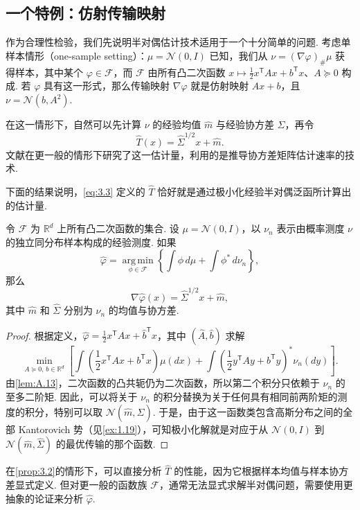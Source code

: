 \subsection{一个特例：仿射传输映射}\label{sec:3.3}
作为合理性检验，我们先说明半对偶估计技术适用于一个十分简单的问题. 考虑单样本情形（one-sample setting）：$\mu=\mathcal N(0,I)$ 已知，我们从 $\nu=(\nabla\varphi)_\#\mu$ 获得样本，其中某个 $\varphi\in\mathcal F$，而 $\mathcal F$ 由所有凸二次函数 $x\mapsto\frac12 x^{\mathsf T}Ax+b^{\mathsf T}x$、$A\succeq0$ 构成. 若 $\varphi$ 具有这一形式，那么传输映射 $\nabla\varphi$ 就是仿射映射 $Ax+b$，且 $\nu=\mathcal N(b,A^2)$.

在这一情形下，自然可以先计算 $\nu$ 的经验均值 $\widehat m$ 与经验协方差 $\widehat\Sigma$，再令
\begin{equation}\label{eq:3.3}
\widehat T(x)=\widehat\Sigma^{1/2}x+\widehat m.
\end{equation}
文献\cite{ref135}在更一般的情形下研究了这一估计量，利用的是推导协方差矩阵估计速率的技术.

下面的结果说明，\eqref{eq:3.3} 定义的 $\widehat T$ 恰好就是通过极小化经验半对偶泛函所计算出的估计量.

\begin{proposition}\label{prop:3.2}
令 $\mathcal F$ 为 $\mathbb R^d$ 上所有凸二次函数的集合. 设 $\mu=\mathcal N(0,I)$，以 $\nu_n$ 表示由概率测度 $\nu$ 的独立同分布样本构成的经验测度. 如果
$$\widehat\varphi=\operatorname*{arg\,min}_{\phi\in\mathcal F}
\left\{\int\phi\,d\mu+\int\phi^*\,d\nu_n\right\},$$
那么
$$\nabla\widehat\varphi(x)=\widehat\Sigma^{1/2}x+\widehat m,$$
其中 $\widehat m$ 和 $\widehat\Sigma$ 分别为 $\nu_n$ 的均值与协方差.
\end{proposition}
\begin{proof}
根据定义，$\widehat\varphi=\frac12x^{\mathsf T}\widehat A x+\widehat b^{\mathsf T}x$，其中 $(\widehat A,\widehat b)$ 求解
$$
\min_{A\succeq0,\,b\in\mathbb R^d}
\left[\int\left(\frac12x^{\mathsf T}Ax+b^{\mathsf T}x\right)\mu(dx)
+\int\left(\frac12y^{\mathsf T}Ay+b^{\mathsf T}y\right)^*\nu_n(dy)\right].
$$
由\autoref{lem:A.13}，二次函数的凸共轭仍为二次函数，所以第二个积分只依赖于 $\nu_n$ 的至多二阶矩. 因此，可以将关于 $\nu_n$ 的积分替换为关于任何具有相同前两阶矩的测度的积分，特别可以取 $\mathcal N(\widehat m,\widehat\Sigma)$. 于是，由于这一函数类包含高斯分布之间的全部 Kantorovich 势（见\autoref{ex:1.19}），可知极小化解就是对应于从 $\mathcal N(0,I)$ 到 $\mathcal N(\widehat m,\widehat\Sigma)$ 的最优传输的那个函数.
\end{proof}

在\autoref{prop:3.2}的情形下，可以直接分析 $\widehat T$ 的性能，因为它根据样本均值与样本协方差显式定义. 但对更一般的函数族 $\mathcal F$，通常无法显式求解半对偶问题，需要使用更抽象的论证来分析 $\widehat\varphi$.
